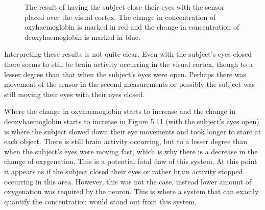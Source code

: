 \begin{figure}[htp]
\centering
{}
\caption[Frontal Lobe Measurements while Relaxed]{The result of having the subject close their eyes with the sensor placed over the visual cortex. The change in concentration of oxyhaemoglobin is marked in red and the change in concentration of deoxyhaemoglobin is marked in blue.}
\end{figure}

Interpreting these results is not quite clear. Even with the subject's eyes closed there seems to still be brain activity occurring in the visual cortex, though to a lesser degree than that when the subject's eyes were open. Perhaps there was movement of the sensor in the second measurements or possibly the subject was still moving their eyes with their eyes closed. 

Where the change in oxyhaemoglobin starts to increase and the change in deoxyhaemoglobin starts to increase in Figure 5.11 (with the subject's eyes open) is where the subject slowed down their eye movements and took longer to stare at each object. There is still brain activity occurring, but to a lesser degree than when the subject's eyes were moving fast, which is why there is a decrease in the change of oxygenation. This is a potential fatal flaw of this system. At this point it appears as if the subject closed their eyes or rather brain activity stopped occurring in this area. However, this was not the case, instead lower amount of oxygenation was required by the neuron. This is where a system that can exactly quantify the concentration would stand out from this system.

